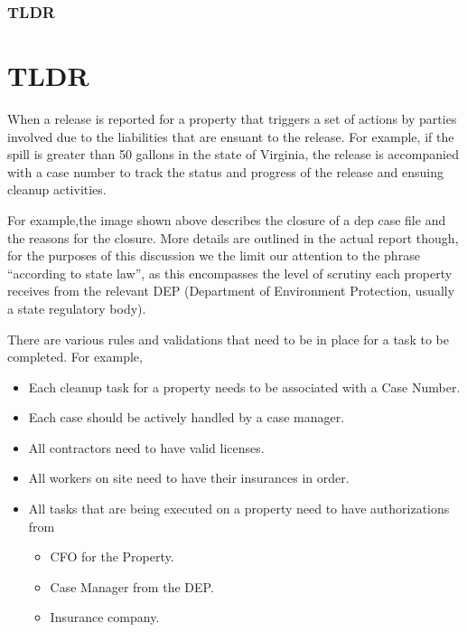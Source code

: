 \documentclass{beamer}
\newcommand{\quotes}[1]{``#1''}
\begin{document}
\begin{frame}
\frametitle{TLDR}
\section{TLDR}
  When a release is reported for a property that triggers a set of actions by parties involved due to the liabilities that are ensuant to the release. For example, if the spill is greater than 50 gallons in the state of Virginia, the release is accompanied with a case number to track the status and progress of the release and ensuing cleanup activities.

  For example,the image shown above describes the closure of a dep case file and the reasons for the closure. More details are outlined in the actual report though, for the purposes of this discussion we the limit our attention to the phrase \quotes{according to state law}, as this encompasses the level of scrutiny each property receives from the relevant DEP (Department of Environment Protection, usually a state regulatory body). 

  There are various rules and validations that need to be in place for a task to be completed. For example, 
    \begin{itemize}
        \item Each cleanup task for a property needs to be associated with a Case Number. 
        \item Each case should be actively handled by a case manager.
        \item All contractors need to have valid licenses.
        \item All workers on site need to have their insurances in order.
        \item All tasks that are being executed on a property need to have authorizations from
          \begin{itemize}
            \item CFO for the Property.
            \item Case Manager from the DEP.
            \item Insurance company. 
          \end{itemize}
    \end{itemize}
\end{frame}
\end{document}
